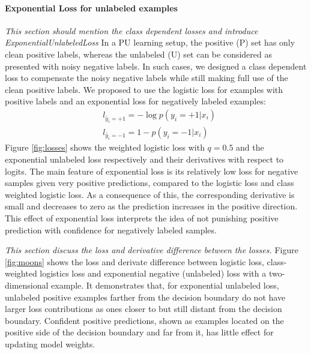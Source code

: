 \paragraph{Exponential Loss for unlabeled examples}
\noindent
\noindent \textit{This section should mention the class dependent losses and introduce ExponentialUnlabeledLoss}
In a PU learning setup, the positive (P) set has only clean positive labels, whereas the unlabeled (U) set can be considered as presented with noisy negative labels.
In such cases, we designed a class dependent loss to compensate the noisy negative labels while still making full use of the clean positive labels.
We proposed to use the logistic loss for examples with positive labels and an exponential loss \cite{tax2016class} for negatively labeled examples:
\begin{equation*}
  \begin{aligned}
    & l_{\tilde{y_i}=+1} = - \log p(y_i=+1 \vert x_i) \\
    & l_{\tilde{y_i}=-1} = 1 - p(y_i=-1|x_i)
  \end{aligned}
\end{equation*}
Figure \ref{fig:losses} shows the weighted logistic loss with $q=0.5$ and the exponential unlabeled loss respectively and their derivatives with respect to logits.
The main feature of exponential loss is its relatively low loss for negative samples given very positive predictions, compared to the logistic loss and class weighted logistic loss.
As a consequence of this, the corresponding derivative is small and decreases to zero as the prediction increases in the positive direction.
This effect of exponential loss interprets the idea of not punishing positive prediction with confidence for negatively labeled samples.


\noindent \textit{This section discuss the loss and derivative difference between the losses.}
\noindent
Figure \ref{fig:moons} shows the loss and derivate difference between logistic loss, class-weighted logistics loss and exponential negative (unlabeled) loss with a two-dimensional example.
It demonstrates that, for exponential unlabeled loss, unlabeled positive examples farther from the decision boundary do not have larger loss contributions as ones closer to but still distant from the decision boundary.
Confident positive predictions, shown as examples located on the positive side of the decision boundary and far from it, has little effect for updating model weights.

